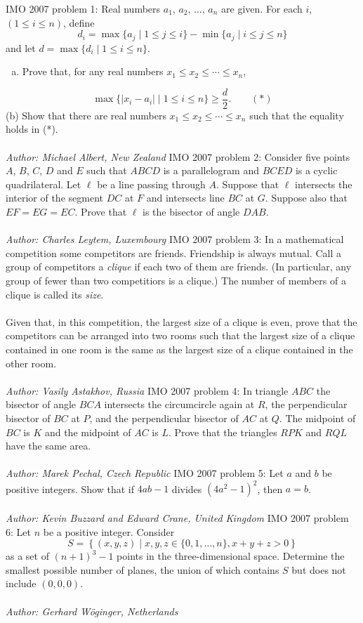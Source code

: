 IMO 2007 problem 1:  Real numbers $ a_1$, $ a_2$, $ \ldots$, $ a_n$ are given. For each $ i$, $ (1 \leq i \leq n )$, define
\[ d_i = \max \{ a_j\mid 1 \leq j \leq i \} - \min \{ a_j\mid i \leq j \leq n \} \]
and let $ d = \max \{d_i\mid 1 \leq i \leq n \}$.
\begin{enumerate}[(a)]
  \item Prove that, for any real numbers $ x_1\leq x_2\leq \cdots \leq x_n$,
\end{enumerate}
\[ \max \{ |x_i - a_i| \mid 1 \leq i \leq n \}\geq \frac {d}{2}. \quad \quad (*) \]
(b) Show that there are real numbers $ x_1\leq x_2\leq \cdots \leq x_n$ such that the equality holds in (*). \\\\
\textit{Author: Michael Albert, New Zealand} 
IMO 2007 problem 2:  Consider five points $ A$, $ B$, $ C$, $ D$ and $ E$ such that $ ABCD$ is a parallelogram and $ BCED$ is a cyclic quadrilateral. Let $ \ell$ be a line passing through $ A$. Suppose that $ \ell$ intersects the interior of the segment $ DC$ at $ F$ and intersects line $ BC$ at $ G$. Suppose also that $ EF = EG = EC$. Prove that $ \ell$ is the bisector of angle $ DAB$. \\\\
\textit{Author: Charles Leytem, Luxembourg} 
IMO 2007 problem 3:  In a mathematical competition some competitors are friends. Friendship is always mutual. Call a group of competitors a \textit{clique} if each two of them are friends. (In particular, any group of fewer than two competitiors is a clique.) The number of members of a clique is called its \textit{size}. \\\\
Given that, in this competition, the largest size of a clique is even, prove that the competitors can be arranged into two rooms such that the largest size of a clique contained in one room is the same as the largest size of a clique contained in the other room. \\\\
\textit{Author: Vasily Astakhov, Russia} 
IMO 2007 problem 4:  In triangle $ ABC$ the bisector of angle $ BCA$ intersects the circumcircle again at $ R$, the perpendicular bisector of $ BC$ at $ P$, and the perpendicular bisector of $ AC$ at $ Q$. The midpoint of $ BC$ is $ K$ and the midpoint of $ AC$ is $ L$. Prove that the triangles $ RPK$ and $ RQL$ have the same area. \\\\
\textit{Author: Marek Pechal, Czech Republic} 
IMO 2007 problem 5:  Let $a$ and $b$ be positive integers. Show that if $4ab - 1$ divides $(4a^2 - 1)^2$, then $a = b$. \\\\
\textit{Author: Kevin Buzzard and Edward Crane, United Kingdom } 
IMO 2007 problem 6:  Let $ n$ be a positive integer. Consider
\[ S = \left\{ (x,y,z) \mid x,y,z \in \{ 0, 1, \ldots, n\}, x + y + z > 0 \right \} \]
as a set of $ (n + 1)^3 - 1$ points in the three-dimensional space. Determine the smallest possible number of planes, the union of which contains $ S$ but does not include $ (0,0,0)$. \\\\
\textit{Author: Gerhard Wöginger, Netherlands } 

